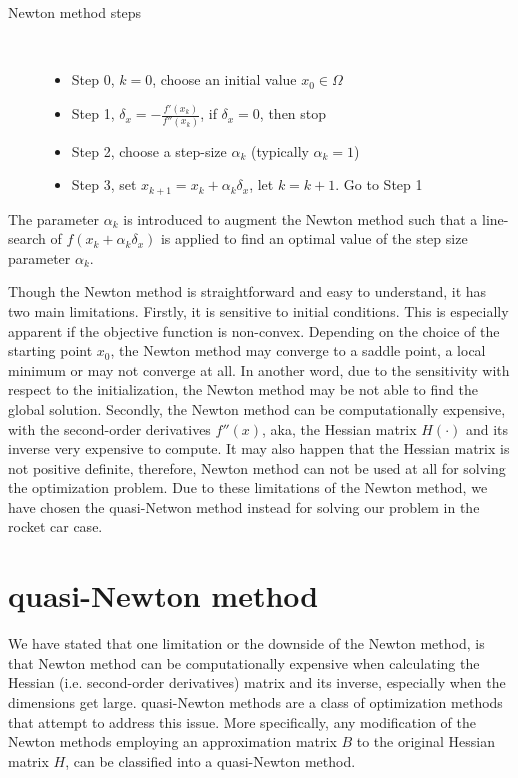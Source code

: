 \begin{description}
	\item[Newton method steps]\ 
	\begin{itemize}
		\item Step 0, $k=0$, choose an initial value $x_0 \in \Omega$ 
		\item Step 1, $\delta_x  = - \frac{ f'(x_k)}{f''(x_k)}$, if $\delta_x =0$, then stop
		\item Step 2, choose a step-size $\alpha_k$ (typically $\alpha_k =1$)
		\item Step 3, set $x_{k+1}  = x_k + \alpha_k \delta_x $, let $k= k+1$. Go to Step 1
	\end{itemize}
\end{description}

The parameter $\alpha_k$ is introduced to augment the Newton method such that a line-search of $f(x_k + \alpha_k \delta_x)$ is applied to find an optimal value of the step size parameter $\alpha_k$. 

Though the Newton method is straightforward and easy to understand, it has two main limitations. Firstly, it is sensitive to initial conditions. This is especially apparent if the objective function is non-convex. Depending on the choice of the starting point $x_0$, the Newton method may converge to a saddle point, a local minimum or may not converge at all. In another word, due to the sensitivity with respect to the initialization, the Newton method may be not able to find the global solution. Secondly, the Newton method can be computationally expensive, with the second-order derivatives $f''(x)$, aka, the Hessian matrix $H(\cdot)$ and its inverse very expensive to compute. It may also happen that the Hessian matrix is not positive definite, therefore, Newton method can not be used at all for solving the optimization problem. Due to these limitations of the Newton method, we have chosen the quasi-Netwon method instead for solving our problem in the rocket car case. 

\section{quasi-Newton method}
We have stated that one limitation or the downside of the Newton method, is that Newton method can be computationally expensive when calculating the Hessian (i.e. second-order derivatives)  matrix and its inverse, especially when the dimensions get large. quasi-Newton methods are a class of optimization methods that attempt to address this issue. More specifically, any modification of the Newton methods employing an approximation matrix $B$ to the original Hessian matrix $H$, can be classified into a quasi-Newton method. 

